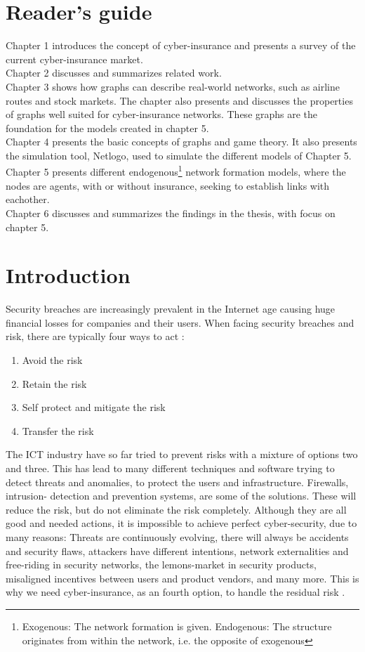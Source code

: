 \section{Reader's guide}
Chapter 1 introduces the concept of cyber-insurance and presents a survey of the current cyber-insurance market. 
\\Chapter 2 discusses and summarizes related work. 
\\Chapter 3 shows how graphs can describe real-world networks, such as airline routes and stock markets. The chapter also presents and discusses the properties of graphs well suited for cyber-insurance networks. These graphs are the foundation for the models created in chapter 5. 
\\Chapter 4 presents the basic concepts of graphs and game theory. It also presents the simulation tool, Netlogo, used to simulate the different models of Chapter 5. 
\\Chapter 5 presents different endogenous\footnote{Exogenous: The network formation is given. Endogenous: The structure originates from within the network, i.e. the opposite of exogenous} network formation models, where the nodes are agents, with or without insurance, seeking to establish links with eachother.  
\\Chapter 6 discusses and summarizes the findings in the thesis, with focus on chapter 5. 


\section{Introduction}
Security breaches are increasingly prevalent in the Internet age causing huge financial losses
for companies and their users. When facing security breaches and risk, there are typically four ways to act \cite{bolot2008new}:
\begin{enumerate}
\item Avoid the risk
\item Retain the risk
\item Self protect and mitigate the risk
\item Transfer the risk
\end{enumerate}
The ICT industry have so far tried to prevent risks with a mixture of options two and three. This has lead to many different techniques and software trying to detect threats and anomalies, to protect the users and infrastructure. Firewalls, intrusion- detection and prevention systems, are some of the solutions. These will reduce the risk, but do not eliminate the risk completely. Although they are all good and needed actions, it is impossible to achieve perfect cyber-security, due to many reasons: Threats are continuously evolving, there will always be accidents and security flaws, attackers have different intentions, network externalities and free-riding in security networks, the lemons-market in security products, misaligned incentives between users and product vendors, and many more. 
This is why we need cyber-insurance, as an fourth option, to handle the residual risk \cite{lelarge2009economic,paldifferentiating}.

